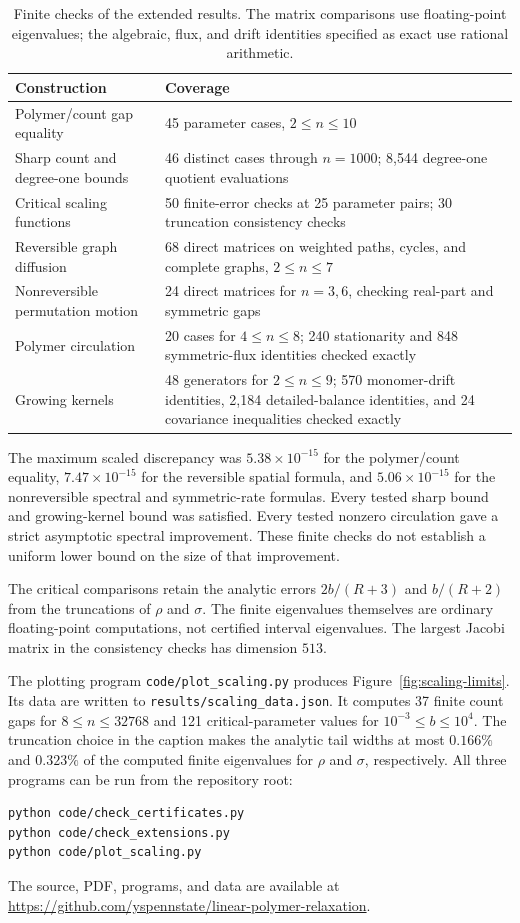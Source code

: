 \begin{table}[htbp]
\centering
\caption{Finite checks of the extended results. The matrix comparisons
use floating-point eigenvalues; the algebraic, flux, and drift
identities specified as exact use rational arithmetic.}
\label{tab:extension-checks}
\small
\begin{tabular}{@{}p{}p{}@{}}
\toprule
Construction & Coverage \\
\midrule
Polymer/count gap equality & 45 parameter cases, $2\le n\le10$ \\
Sharp count and degree-one bounds & 46 distinct cases through $n=1000$; 8,544 degree-one quotient evaluations \\
Critical scaling functions & 50 finite-error checks at 25 parameter pairs; 30 truncation consistency checks \\
Reversible graph diffusion & 68 direct matrices on weighted paths, cycles, and complete graphs, $2\le n\le7$ \\
Nonreversible permutation motion & 24 direct matrices for $n=3,6$, checking real-part and symmetric gaps \\
Polymer circulation & 20 cases for $4\le n\le8$; 240 stationarity and 848 symmetric-flux identities checked exactly \\
Growing kernels & 48 generators for $2\le n\le9$; 570 monomer-drift identities, 2,184 detailed-balance identities, and 24 covariance inequalities checked exactly \\
\bottomrule
\end{tabular}
\end{table}

The maximum scaled discrepancy was $5.38\times10^{-15}$ for the
polymer/count equality, $7.47\times10^{-15}$ for the reversible spatial
formula, and $5.06\times10^{-15}$ for the nonreversible spectral and
symmetric-rate formulas. Every tested sharp bound and growing-kernel
bound was satisfied. Every tested nonzero circulation gave a strict
asymptotic spectral improvement. These finite checks do not establish
a uniform lower bound on the size of that improvement.

The critical comparisons retain the analytic errors
$2b/(R+3)$ and $b/(R+2)$ from the truncations of $\rho$ and $\sigma$.
The finite eigenvalues themselves are ordinary floating-point
computations, not certified interval eigenvalues.
The largest Jacobi matrix in the consistency checks has dimension
$513$.

The plotting program \texttt{code/plot\_scaling.py} produces
Figure~\ref{fig:scaling-limits}. Its data are written to
\texttt{results/scaling\_data.json}.
It computes 37 finite count gaps
for $8\le n\le32768$ and 121 critical-parameter values for
$10^{-3}\le b\le10^4$.
The truncation choice in the caption makes the analytic tail widths
at most $0.166\%$ and $0.323\%$ of the computed finite eigenvalues
for $\rho$ and $\sigma$, respectively.
All three programs can be run from the repository root:
\begin{verbatim}
python code/check_certificates.py
python code/check_extensions.py
python code/plot_scaling.py
\end{verbatim}
The source, PDF, programs, and data are available at
\url{https://github.com/yspennstate/linear-polymer-relaxation}.

